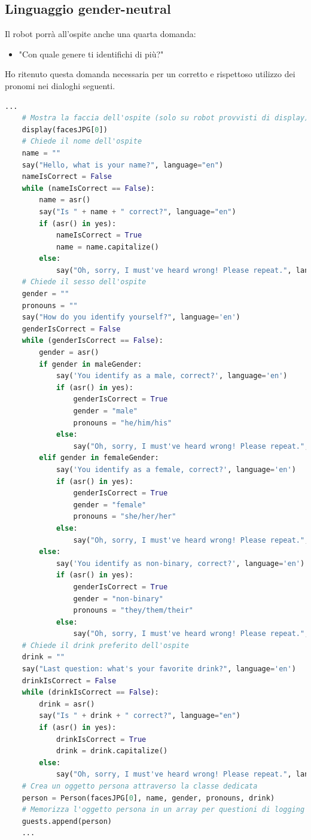 \documentclass[italian, twoside]{sapthesis} %
\begin{document}
\subsection{Linguaggio gender-neutral}
Il robot porrà all'ospite anche una quarta domanda:
    \begin{itemize}
	    \item "Con quale genere ti identifichi di più?"
    \end{itemize}
Ho ritenuto questa domanda necessaria per un corretto e rispettoso utilizzo dei pronomi nei dialoghi seguenti.

\begin{lstlisting}[language=Python]
    ...
    # Mostra la faccia dell'ospite (solo su robot provvisti di display)
    display(facesJPG[0])
    # Chiede il nome dell'ospite
    name = ""
    say("Hello, what is your name?", language="en")
    nameIsCorrect = False
    while (nameIsCorrect == False):
        name = asr()
        say("Is " + name + " correct?", language="en")
        if (asr() in yes):
            nameIsCorrect = True
            name = name.capitalize()
        else:
            say("Oh, sorry, I must've heard wrong! Please repeat.", language="en")
    # Chiede il sesso dell'ospite
    gender = ""
    pronouns = ""
    say("How do you identify yourself?", language='en')
    genderIsCorrect = False
    while (genderIsCorrect == False):
        gender = asr()
        if gender in maleGender:
            say('You identify as a male, correct?', language='en')
            if (asr() in yes):
                genderIsCorrect = True
                gender = "male"
                pronouns = "he/him/his"
            else:
                say("Oh, sorry, I must've heard wrong! Please repeat.", language="en")
        elif gender in femaleGender:
            say('You identify as a female, correct?', language='en')
            if (asr() in yes):
                genderIsCorrect = True
                gender = "female"
                pronouns = "she/her/her"
            else:
                say("Oh, sorry, I must've heard wrong! Please repeat.", language="en")
        else:
            say('You identify as non-binary, correct?', language='en')
            if (asr() in yes):
                genderIsCorrect = True
                gender = "non-binary"
                pronouns = "they/them/their"
            else:
                say("Oh, sorry, I must've heard wrong! Please repeat.", language="en")
    # Chiede il drink preferito dell'ospite
    drink = ""
    say("Last question: what's your favorite drink?", language='en')
    drinkIsCorrect = False
    while (drinkIsCorrect == False):
        drink = asr()
        say("Is " + drink + " correct?", language="en")
        if (asr() in yes):
            drinkIsCorrect = True
            drink = drink.capitalize()
        else:
            say("Oh, sorry, I must've heard wrong! Please repeat.", language="en")
    # Crea un oggetto persona attraverso la classe dedicata
    person = Person(facesJPG[0], name, gender, pronouns, drink)
    # Memorizza l'oggetto persona in un array per questioni di logging
    guests.append(person)
    ...
\end{lstlisting}
\end{document}
